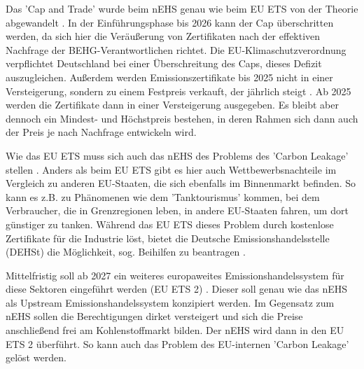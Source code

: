 Das 'Cap and Trade' wurde beim nEHS genau wie beim EU ETS von der Theorie abgewandelt \cite{dehst.2023}.
In der Einführungsphase bis 2026 kann der Cap überschritten werden, da sich hier die Veräußerung von Zertifikaten nach der effektiven Nachfrage der BEHG-Verantwortlichen richtet.
Die EU-Klimaschutzverordnung verpflichtet Deutschland bei einer Überschreitung des Caps, dieses Defizit auszugleichen. 
Außerdem werden Emissionszertifikate bis 2025 nicht in einer Versteigerung, sondern zu einem Festpreis verkauft, der jährlich steigt \cite{dehst.2023} .
Ab 2025 werden die Zertifikate dann in einer Versteigerung ausgegeben.
Es bleibt aber dennoch ein Mindest- und Höchstpreis bestehen, in deren Rahmen sich dann auch der Preis je nach Nachfrage entwickeln wird.

Wie das EU ETS muss sich auch das nEHS des Problems des 'Carbon Leakage' stellen \cite{dehst2.2023}. 
Anders als beim EU ETS gibt es hier auch Wettbewerbsnachteile im Vergleich zu anderen EU-Staaten, die sich ebenfalls im Binnenmarkt befinden.
So kann es z.B. zu Phänomenen wie dem 'Tanktourismus' kommen, bei dem Verbraucher, die in Grenzregionen leben, in andere EU-Staaten fahren, um dort günstiger zu tanken.
Während das EU ETS dieses Problem durch kostenlose Zertifikate für die Industrie löst, bietet die Deutsche Emissionshandelsstelle (DEHSt) die Möglichkeit, sog. Beihilfen zu beantragen \cite{dehst2.2023}.

Mittelfristig soll ab 2027 ein weiteres europaweites Emissionshandelssystem für diese Sektoren eingeführt werden (EU ETS 2) \cite{ub.2023}.
Dieser soll genau wie das nEHS als Upstream Emissionshandelssystem konzipiert werden. Im Gegensatz zum nEHS sollen die Berechtigungen dirket versteigert und sich die Preise anschließend frei am Kohlenstoffmarkt bilden. 
Der nEHS wird dann in den EU ETS 2 überführt. So kann auch das Problem des EU-internen 'Carbon Leakage' gelöst werden.